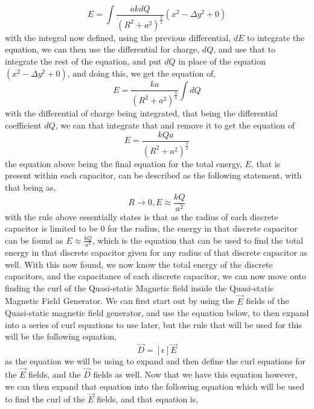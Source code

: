 \documentclass[]{article}
\begin{document}
\begin{equation}
E = \int \frac{akdQ}{(R^2+a^2)^\frac{3}{2}} (x^2 - \Delta{y}^2 + 0)
\end{equation}
with the integral now defined, using the previous differential, $dE$ to integrate the equation, we can then use the differential for charge, $dQ$, and use that to integrate the rest of the equation, and put $dQ$ in place of the equation $(x^2-\Delta{y}^2+0)$, and doing this, we get the equation of,
\begin{equation}
E = \frac{ka}{(R^2+a^2)^\frac{3}{2}} \int dQ
\end{equation}
with the differential of charge being integrated, that being the differential coefficient $dQ$, we can that integrate that and remove it to get the equation of
\begin{equation}
E = \frac{kQa}{(R^2+a^2)^\frac{3}{2}}
\end{equation}
the equation above being the final equation for the total energy, $E$, that is present within each capacitor, can be described as the following statement, with that being as,
\begin{equation}
R \rightarrow 0, E \approx \frac{kQ}{a^2}
\end{equation}
with the rule above essentially states is that as the radius of each discrete capacitor is limited to be 0 for the radius, the energy in that discrete capacitor can be found as $E \approx \frac{kQ}{a^2}$, which is the equation that can be used to find the total energy in that discrete capacitor given for any radius of that discrete capacitor as well. With this now found, we now know the total energy of the discrete capacitors, and the capacitance of each discrete capacitor, we can now move onto finding the curl of the Quasi-static Magnetic field inside the Quasi-static Magnetic Field Generator. We can first start out by using the $\vec{E}$ fields of the Quasi-static magnetic field generator, and use the equation below, to then expand into a series of curl equations to use later, but the rule that will be used for this will be the following equation,
\begin{equation}
\vec{D} = [\epsilon]\vec{E}
\end{equation}
as the equation we will be using to expand and then define the curl equations for the $\vec{E}$ fields, and the $\vec{D}$ fields as well. Now that we have this equation however, we can then expand that equation into the following equation which will be used to find the curl of the $\vec{E}$ fields, and that equation is,
\end{document}
